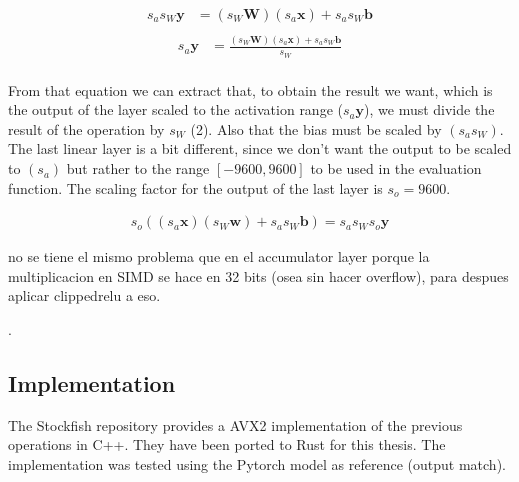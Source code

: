 \begin{equation}
\begin{aligned}
s_a s_W \bm{y} &= (s_W \bm{W}) (s_a \bm{x}) + s_a s_W \bm{b} \\
\end{aligned}
\end{equation}
\begin{equation}
\begin{aligned}
s_a \bm{y} &= \frac{(s_W \bm{W}) (s_a \bm{x}) + s_a s_W \bm{b}}{s_W} \\
\end{aligned}
\end{equation}

From that equation we can extract that, to obtain the result we want, which is the output of the layer scaled to the activation range ($s_a \bm{y}$), we must divide the result of the operation by $s_W$ (2). Also that the bias must be scaled by $(s_a s_W)$. \\

The last linear layer is a bit different, since we don't want the output to be scaled to $(s_a)$ but rather to the range $[-9600, 9600]$ to be used in the evaluation function. The scaling factor for the output of the last layer is $s_o=9600$.

\begin{equation}
\begin{aligned}
s_o ((s_a \bm{x}) (s_W \bm{w}) + s_a s_W \bm{b}) = s_a s_W s_o \bm{y}
\end{aligned}
\end{equation}







no se tiene el mismo problema que en el accumulator layer porque la multiplicacion en SIMD se hace en 32 bits (osea sin hacer overflow), para despues aplicar clippedrelu a eso.

. \\

\subsection{Implementation}

The Stockfish repository provides a AVX2 implementation of the previous operations in C++. They have been ported to Rust for this thesis. The implementation was tested using the Pytorch model as reference (output match).


